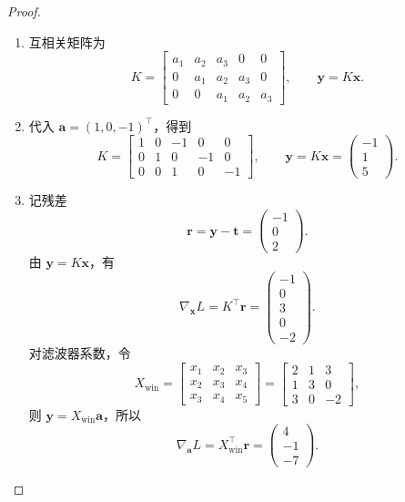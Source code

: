 \begin{proof}
    \begin{enumerate}
        \item 互相关矩阵为
        \[
            K=\begin{bmatrix}
                a_1&a_2&a_3&0&0\\
                0&a_1&a_2&a_3&0\\
                0&0&a_1&a_2&a_3
              \end{bmatrix},
            \qquad
            \boxed{\bm{y}=K\bm{x}}.
        \]
        \item 代入 $\bm{a}=(1,0,-1)^\top$，得到
        \[
            K=\begin{bmatrix}
                1&0&-1&0&0\\
                0&1&0&-1&0\\
                0&0&1&0&-1
              \end{bmatrix},
            \qquad
            \bm{y}=K\bm{x}
            =\boxed{\begin{pmatrix}-1\\1\\5\end{pmatrix}}.
        \]
        \item 记残差
        \[
            \bm{r}=\bm{y}-\bm{t}
            =\begin{pmatrix}-1\\0\\2\end{pmatrix}.
        \]
        由 $\bm{y}=K\bm{x}$，有
        \[
            \nabla_{\bm{x}}L
            =K^\top\bm{r}
            =\boxed{\begin{pmatrix}-1\\0\\3\\0\\-2\end{pmatrix}}.
        \]
        对滤波器系数，令
        \[
            X_{\mathrm{win}}
            =\begin{bmatrix}
                x_1&x_2&x_3\\
                x_2&x_3&x_4\\
                x_3&x_4&x_5
              \end{bmatrix}
            =\begin{bmatrix}
                2&1&3\\
                1&3&0\\
                3&0&-2
              \end{bmatrix},
        \]
        则 $\bm{y}=X_{\mathrm{win}}\bm{a}$，所以
        \[
            \nabla_{\bm{a}}L
            =X_{\mathrm{win}}^\top\bm{r}
            =\boxed{\begin{pmatrix}4\\-1\\-7\end{pmatrix}}.
        \]
    \end{enumerate}
\end{proof}
